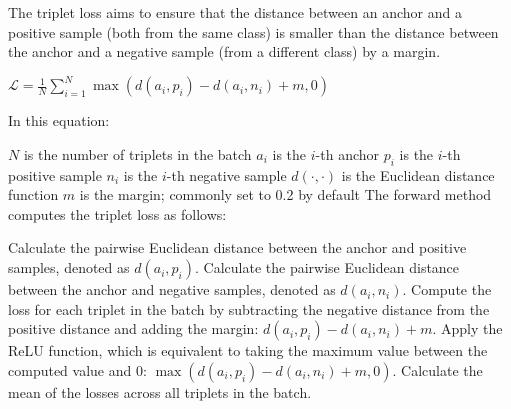The triplet loss aims to ensure that the distance between an anchor and a positive sample (both from the same class) is smaller than the distance between the anchor and a negative sample (from a different class) by a margin.

$\mathcal{L} = \frac{1}{N}\sum_{i=1}^{N} \max \left( d\left(a_i, p_i\right) - d\left(a_i, n_i\right) + m, 0 \right)$

In this equation:

$N$ is the number of triplets in the batch
$a_i$ is the $i$-th anchor
$p_i$ is the $i$-th positive sample
$n_i$ is the $i$-th negative sample
$d(\cdot, \cdot)$ is the Euclidean distance function
$m$ is the margin; commonly set to 0.2 by default
The forward method computes the triplet loss as follows:

Calculate the pairwise Euclidean distance between the anchor and positive samples, denoted as $d(a_i, p_i)$.
Calculate the pairwise Euclidean distance between the anchor and negative samples, denoted as $d(a_i, n_i)$.
Compute the loss for each triplet in the batch by subtracting the negative distance from the positive distance and adding the margin: $d(a_i, p_i) - d(a_i, n_i) + m$.
Apply the ReLU function, which is equivalent to taking the maximum value between the computed value and 0: $\max \left( d(a_i, p_i) - d(a_i, n_i) + m, 0 \right)$.
Calculate the mean of the losses across all triplets in the batch.